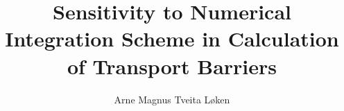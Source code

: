 \title{\Huge Sensitivity to Numerical Integration Scheme in Calculation of
Transport Barriers}

\author[ ]{Arne Magnus Tveita Løken}


\renewcommand\Affilfont{\itshape\small}

\maketitle
